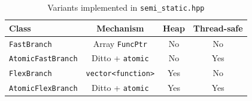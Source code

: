 \begin{table}[ht]
\centering
\caption{Variants implemented in \texttt{semi\_static.hpp}}
\label{tab:clases}
\begin{tabular}{@{}lccc@{}}
\toprule
\textbf{Class} & \textbf{Mechanism} & \textbf{Heap} & \textbf{Thread-safe} \\ \midrule
\texttt{FastBranch}       & Array \texttt{FuncPtr}   & No & No \\
\texttt{AtomicFastBranch} & Ditto + \texttt{atomic}   & No & Yes \\
\texttt{FlexBranch}       & \texttt{vector<function>} & Yes & No \\
\texttt{AtomicFlexBranch} & Ditto + \texttt{atomic}   & Yes & Yes \\ \bottomrule
\end{tabular}
\end{table}

